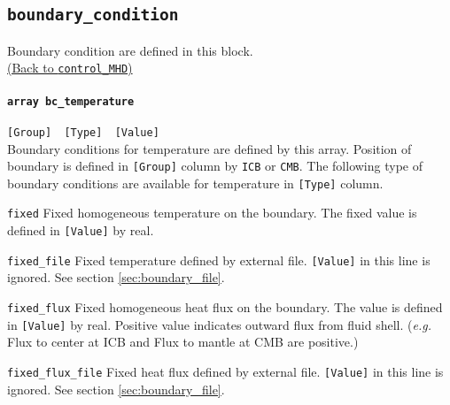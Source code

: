 \subsection{\tt boundary\_condition}
\label{href_t:boundary_condition}
Boundary condition are defined in this block. \\
\hyperref[href_i:boundary_condition]{(Back to {\tt control\_MHD})}

\paragraph{\tt array bc\_temperature}
\label{href_t:bc_temperature}
\verb|[Group]  [Type]  [Value]| \\
Boundary conditions for temperature are defined by this array. Position of boundary is defined in \verb|[Group]| column by {\tt ICB} or {\tt CMB}. The following type of boundary conditions are available for temperature in \verb|[Type]| column.
%
\begin{description}
\item{\tt fixed}			Fixed homogeneous temperature on the boundary. The fixed value is defined in \verb|[Value]| by real.
\item{\tt fixed\_file}			Fixed temperature defined by external file. \verb|[Value]| in this line is ignored. See section \ref{sec:boundary_file}.
\item{\tt fixed\_flux}	Fixed homogeneous heat flux on the boundary. The value is defined in \verb|[Value]| by real. Positive value indicates outward flux from fluid shell. ({\it e.g.} Flux to center at ICB and Flux to mantle at CMB are positive.)
\item{\tt fixed\_flux\_file}			Fixed heat flux defined by external file. \verb|[Value]| in this line is ignored.  See section \ref{sec:boundary_file}.
\end{description}
%

